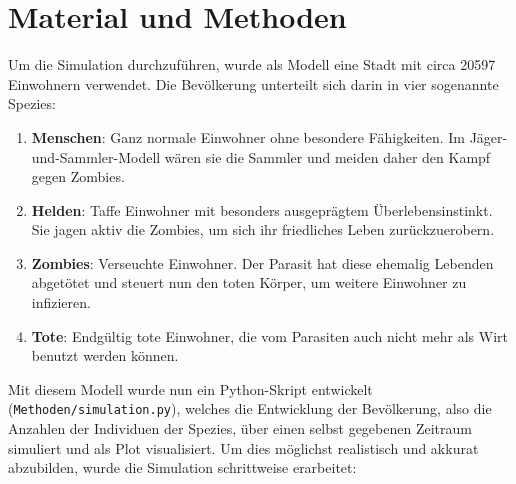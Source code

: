 \section{Material und Methoden} %
    \label{sec:material_und_methoden}
    Um die Simulation durchzuführen, wurde als Modell eine Stadt mit circa 20597 Einwohnern verwendet. Die Bevölkerung unterteilt sich darin in vier sogenannte Spezies:
    \begin{enumerate}[1.]
        \item \textbf{Menschen}:
            Ganz normale Einwohner ohne besondere Fähigkeiten. Im Jäger-und-Sammler-Modell wären sie die Sammler und meiden daher den Kampf gegen Zombies.\label{species}
        \item \textbf{Helden}:
            Taffe Einwohner mit besonders ausgeprägtem Überlebensinstinkt. Sie jagen aktiv die Zombies, um sich ihr friedliches Leben zurückzuerobern.
        \item \textbf{Zombies}:
            Verseuchte Einwohner. Der Parasit hat diese ehemalig Lebenden abgetötet und steuert nun den toten Körper, um weitere Einwohner zu infizieren.
        \item \textbf{Tote}:
            Endgültig tote Einwohner, die vom Parasiten auch nicht mehr als Wirt benutzt werden können.
    \end{enumerate}
    Mit diesem Modell wurde nun ein Python-Skript entwickelt (\texttt{Methoden/simulation.py}), welches die Entwicklung der Bevölkerung, also die Anzahlen der Individuen der Spezies, über einen selbst gegebenen Zeitraum simuliert und als Plot visualisiert. Um dies möglichst realistisch und akkurat abzubilden, wurde die Simulation schrittweise erarbeitet:
